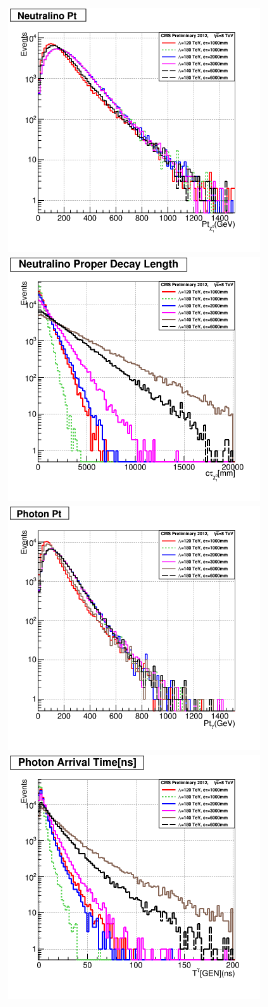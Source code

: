 \begin{minipage}{0.90\linewidth} 
\begin{center}
\mbox{\includegraphics[height=0.45\textwidth,width=0.5\textwidth]{THESISPLOTS/GMSB-SPS8-MODEL-Neutralinio-Pt.png} \hspace{-1cm}
\includegraphics[height=0.45\textwidth,width=0.5\textwidth]{THESISPLOTS/GMSB-SPS8-MODEL-Neutralino-Proper-DecayLength.png}} \\
\hspace{0.5cm}
\mbox{\includegraphics[height=0.45\textwidth,width=0.5\textwidth]{THESISPLOTS/GMSB-SPS8-MODEL-Photon-Pt.png} \hspace{-1cm}
\includegraphics[height=0.45\textwidth,width=0.5\textwidth]{THESISPLOTS/GMSB-SPS8-MODEL-Photon-Arrival-Time.png}}

\end{center}
\end{minipage}
